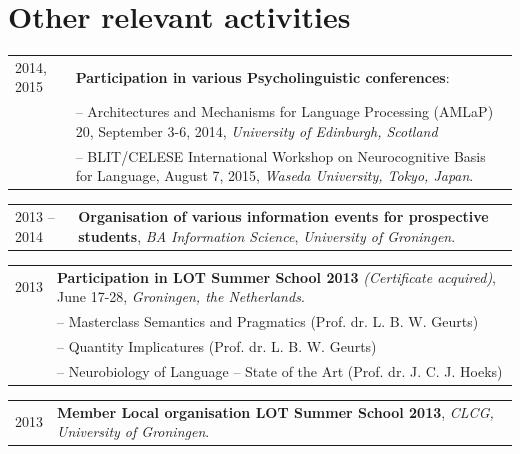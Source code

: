 \documentclass[a4paper,10pt]{article}
\def\leftcolwidth{.12\textwidth}
\def\tablevspace{10pt}
\begin{document}
\section*{Other relevant activities}

\begin{tabularx}{\textwidth}{ p{\leftcolwidth} X }
  2014, 2015 
       & \textbf{Participation in various Psycholinguistic conferences}:\\
       & -- Architectures and Mechanisms for Language Processing (AMLaP) 20, 
        September 3-6, 2014, \textit{University of Edinburgh, Scotland}\\
       & -- BLIT/CELESE International Workshop on Neurocognitive Basis for Language, 
        August 7, 2015, \textit{Waseda University, Tokyo, Japan}.\\
\end{tabularx}

\vspace{\tablevspace}

\noindent
\begin{tabularx}{\textwidth}{ p{\leftcolwidth} X }
  2013 -- 2014
  & \textbf{Organisation of various information events for prospective students}, 
  \textit{BA Information Science}, \textit{University of Groningen}.\\
\end{tabularx}

\vspace{\tablevspace}

\noindent
\begin{tabularx}{\textwidth}{ p{\leftcolwidth} X }
  2013 & \textbf{Participation in LOT Summer School 2013} \textit{(Certificate acquired)}, June 17-28,
         \textit{Groningen, the Netherlands}.\\
       & -- {Masterclass Semantics and Pragmatics} (Prof. dr. L. B. W. Geurts)\\
       & -- {Quantity Implicatures} (Prof. dr. L. B. W. Geurts)\\
       & -- {Neurobiology of Language -- State of the Art} (Prof. dr. J. C. J. Hoeks)\\
\end{tabularx}

\vspace{\tablevspace}

\noindent
\begin{tabularx}{\textwidth}{ p{\leftcolwidth} X }
  2013
  & \textbf{Member Local organisation LOT Summer School 2013},
    \textit{CLCG, University of Groningen}.\\
\end{tabularx}
\end{document}
